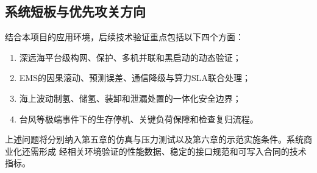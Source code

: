 \subsection{系统短板与优先攻关方向}

结合本项目的应用环境，后续技术验证重点包括以下四个方面：
\begin{enumerate}
  \item 深远海平台级构网、保护、多机并联和黑启动的动态验证；
  \item EMS的因果滚动、预测误差、通信降级与算力SLA联合处理；
  \item 海上波动制氢、储氢、装卸和泄漏处置的一体化安全边界；
  \item 台风等极端事件下的生存停机、关键负荷保障和检查复归流程。
\end{enumerate}

上述问题将分别纳入第五章的仿真与压力测试以及第六章的示范实施条件。系统商业化还需形成
经相关环境验证的性能数据、稳定的接口规范和可写入合同的技术指标。


